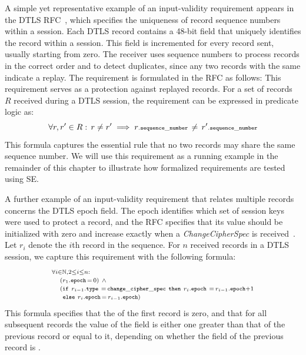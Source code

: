A simple yet representative example of an input-validity requirement appears in the DTLS RFC~\cite[p. 13]{RFC6347}, which specifies the uniqueness of record sequence numbers within a session.
Each DTLS record contains a 48-bit  field that uniquely identifies the record within a session.
This field is incremented for every record sent, usually starting from zero. 
The receiver uses sequence numbers to process records in the correct order and to detect duplicates, since any two records with the same  indicate a replay.
The requirement is formulated in the RFC as follows:
%
%
%
This requirement serves as a protection against replayed records.
For a set of records $R$ received during a DTLS session, the requirement can be expressed in predicate logic as:
%
\begin{equation}\label{const:rsnuniqueness}\normalsize
	\forall r, r' \in R :\, r \neq r' \implies 
	r\mathtt{\scriptstyle.sequence\_number}\, \neq\, r'\mathtt{\scriptstyle.sequence\_number}
\end{equation}
%
This formula captures the essential rule that no two records may share the same sequence number.
We will use this requirement as a running example in the remainder of this chapter
to illustrate how formalized requirements are tested using SE.

A further example of an input-validity requirement that relates multiple records concerns the DTLS epoch field.
The epoch identifies which set of session keys were used to protect a record, and the RFC specifies that its value should be initialized with zero and increase exactly when a \emph{ChangeCipherSpec} is received~\cite[p. 8]{RFC6347}.
Let $r_i$ denote the $i$th record in the sequence.
For $n$ received records in a DTLS session, we capture this requirement with the following formula:
\begin{equation*}\label{const:epoch}
	\begin{split}
		& \scriptstyle \forall i \in \mathbb{N}, 2 \leq i \leq n: \\[-5pt]  %
		& \scriptstyle \quad (r_1.\rfcm{epoch}\, =\, 0)\ \wedge \\[-5pt]
		& \scriptstyle \quad (\mathtt{if}\ r_{i-1}.\rfcm{type}\ =\, \rfcm{change\_cipher\_spec}\
		\mathtt{then}\ r_i.\rfcm{epoch}\ =\, r_{i-1}.\rfcm{epoch} + 1\\[-5pt]
		& \scriptstyle \quad\ \mathtt{else}\ r_i.\rfcm{epoch}\, =\, r_{i-1}.\rfcm{epoch})
	\end{split}
\end{equation*}
This formula specifies that the  of the first record is zero, and that for all subsequent records the value of the  field is either one greater than that of the previous record or equal to it, depending on whether the  field of the previous record is .

